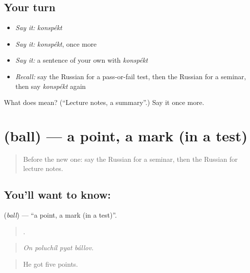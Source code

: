 \subsection*{Your turn}
\begin{itemize}
\raggedright
  \item \emph{Say it:} \emph{konspékt}
  \item \emph{Say it:} \emph{konspékt}, once more
  \item \emph{Say it:} a sentence of your own with \emph{konspékt}
  \item \emph{Recall:} say the Russian for a pass-or-fail test, then the Russian for a seminar, then say \emph{konspékt} again
\end{itemize}

\begin{tcolorbox}[breakable,colback=teal!4,colframe=teal!35!black,title={Before you move on}]
What does  mean? (\textquotedblleft{}Lecture notes, a summary\textquotedblright{}.) Say it once more.
\end{tcolorbox}
\section[\texorpdfstring{\ru{балл} (ball)}{балл (ball)}]{ (ball) — a point, a mark (in a test)}

\label{lesson:RU-C381-ball}



\begin{quote}
Before the new one: say the Russian for a seminar, then the Russian for lecture notes.
\end{quote}

\subsection*{You'll want to know: }
\textbf{} (\emph{ball}) — \textquotedblleft{}a point, a mark (in a test)\textquotedblright{}.

\begin{quote}
   .
\end{quote}

\begin{quote}
\emph{On poluchíl pyat bállov.}
\end{quote}

\begin{quote}
He got five points.
\end{quote}


